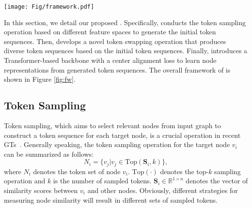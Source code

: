 



\begin{figure*}[t]
\centering
\texttt{[image: Fig/framework.pdf]}
\caption{
The overall framework of \name.
First, we generate the initial token sequences from both the attribute view and topology view. Then, we utilize the proposed token swapping operation to generate new token sequences for each target node. These generated token sequences are then fed into a Transformer-based backbone to learn node representations and generate predicted labels. Additionally, a center alignment loss is adopted to further constrain the representations extracted from different token sequences.
}
\label{fig:fw}
\end{figure*}




In this section, we detail our proposed \name.
Specifically, \name conducts the token sampling operation based on different feature spaces to generate the initial token sequences.
Then, \name develops a novel token swapping operation that produces diverse token sequences based on the initial token sequences.
Finally, \name introduces a Transformer-based backbone with a center alignment loss to learn node representations from generated token sequences.
The overall framework of \name is shown in Figure \ref{fig:fw}.




\subsection{Token Sampling}
Token sampling, which aims to select relevant nodes from input graph to construct a token sequence for each target node, is a crucial operation in recent GTs~\cite{ansgt,vcrgt}.
Generally speaking, the token sampling operation for the target node $v_i$ can be summarized as follows:
\begin{equation}
    N_i = \{v_j | v_j \in \mathrm{Top}(\mathbf{S}_i, k)\},
    \label{eq:token_sampling}
\end{equation}
where $N_i$ denotes the token set of node $v_i$.
$\mathrm{Top}(\cdot)$ denotes the top-$k$ sampling operation and $k$ is the number of sampled tokens. 
$\mathbf{S}_i \in \mathbb{R}^{1\times n}$ denotes the vector of similarity scores between $v_i$ and other nodes.
Obviously, different strategies for measuring node similarity will result in different sets of sampled tokens. 

